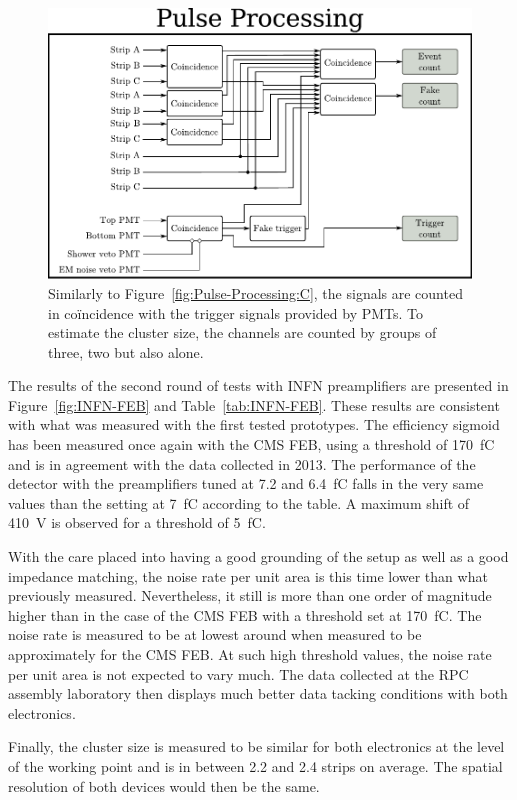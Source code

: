	\begin{figure}[H]
		\centering
		\includegraphics[width=.8\linewidth]{fig/chapt6/pulse-processing-2014.pdf}
		\caption{\label{fig:Pulse-Processing-904} Similarly to Figure~\ref{fig:Pulse-Processing:C}, the signals are counted in coïncidence with the trigger signals provided by PMTs. To estimate the cluster size, the channels are counted by groups of three, two but also alone.}
	\end{figure}
	
	The results of the second round of tests with INFN preamplifiers are presented in Figure~\ref{fig:INFN-FEB} and Table~\ref{tab:INFN-FEB}. These results are consistent with what was measured with the first tested prototypes. The efficiency sigmoid has been measured once again with the CMS FEB, using a threshold of \SI{170}{fC} and is in agreement with the data collected in 2013. The performance of the detector with the preamplifiers tuned at 7.2 and \SI{6.4}{fC} falls in the very same values than the setting at \SI{7}{fC} according to the table. A maximum shift of \SI{410}{V} is observed for a threshold of \SI{5}{fC}.
	
	With the care placed into having a good grounding of the setup as well as a good impedance matching, the noise rate per unit area is this time lower than what previously measured. Nevertheless, it still is more than one order of magnitude higher than in the case of the CMS FEB with a threshold set at \SI{170}{fC}. The noise rate is measured to be at lowest around  when measured to be approximately  for the CMS FEB. At such high threshold values, the noise rate per unit area is not expected to vary much. The data collected at the RPC assembly laboratory then displays much better data tacking conditions with both electronics.
	
	Finally, the cluster size is measured to be similar for both electronics at the level of the working point and is in between 2.2 and 2.4 strips on average. The spatial resolution of both devices would then be the same.
	

